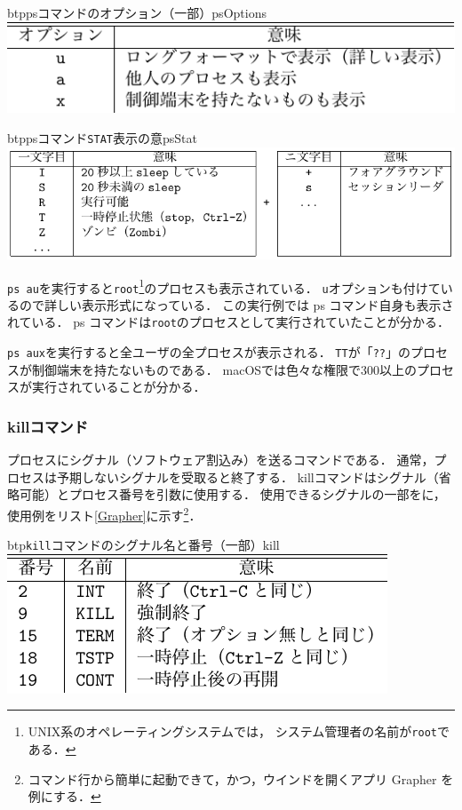 \begin{mytable}{btp}{psコマンドのオプション（一部）}{psOptions}
  \includegraphics[scale=1.0]{Tbl/psOptions.pdf}
\end{mytable}



\begin{mytable}{btp}{psコマンド\texttt{STAT}表示の意}{psStat}
  \includegraphics[scale=1.0]{Tbl/psStat.pdf}
\end{mytable}

\texttt{ps au}を実行すると\texttt{root}\footnote{
UNIX系のオペレーティングシステムでは，
システム管理者の名前が\texttt{root}である．}のプロセスも表示されている．
\texttt{u}オプションも付けているので詳しい表示形式になっている．
この実行例では ps コマンド自身も表示されている．
ps コマンドは\texttt{root}のプロセスとして実行されていたことが分かる．

\texttt{ps aux}を実行すると全ユーザの全プロセスが表示される．
\texttt{TT}が「\texttt{??}」のプロセスが制御端末を持たないものである．
macOSでは色々な権限で300以上のプロセスが実行されていることが分かる．

\subsubsection{killコマンド}

プロセスにシグナル（ソフトウェア割込み）を送るコマンドである．
通常，プロセスは予期しないシグナルを受取ると終了する．
killコマンドはシグナル（省略可能）とプロセス番号を引数に使用する．
使用できるシグナルの一部をに，
使用例をリスト\ref{Grapher}に示す\footnote{
コマンド行から簡単に起動できて，かつ，ウインドを開くアプリ Grapher を例にする．
}．

\begin{mytable}{btp}{\texttt{kill}コマンドのシグナル名と番号（一部）}{kill}
  \includegraphics[scale=1.0]{Tbl/killOptions.pdf}
\end{mytable}

